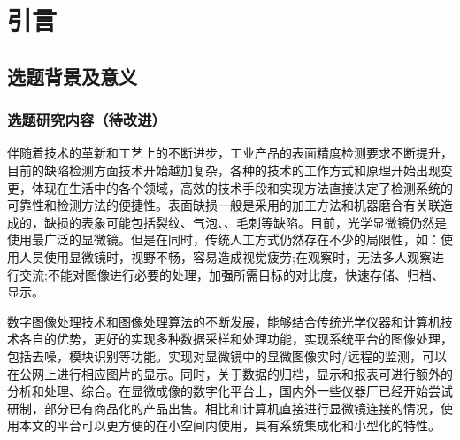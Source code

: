 {\tiny {\tiny }}\chapter{引言}
\section{选题背景及意义}
\subsection{选题研究内容（待改进）}
伴随着技术的革新和工艺上的不断进步，工业产品的表面精度检测要求不断提升，目前的缺陷检测方面技术开始越加复杂，各种的技术的工作方式和原理开始出现变更，体现在生活中的各个领域，高效的技术手段和实现方法直接决定了检测系统的可靠性和检测方法的便捷性。表面缺损一般是采用的加工方法和机器磨合有关联造成的，缺损的表象可能包括裂纹、气泡、、毛刺等缺陷。目前，光学显微镜仍然是使用最广泛的显微镜。但是在同时，传统人工方式仍然存在不少的局限性，如：使用人员使用显微镜时，视野不畅，容易造成视觉疲劳;在观察时，无法多人观察进行交流;不能对图像进行必要的处理，加强所需目标的对比度，快速存储、归档、显示。

数字图像处理技术和图像处理算法的不断发展，能够结合传统光学仪器和计算机技术各自的优势，更好的实现多种数据采样和处理功能，实现系统平台的图像处理，包括去噪，模块识别等功能。实现对显微镜中的显微图像实时/远程的监测，可以在公网上进行相应图片的显示。同时，关于数据的归档，显示和报表可进行额外的分析和处理、综合。在显微成像的数字化平台上，国内外一些仪器厂已经开始尝试研制，部分已有商品化的产品出售。相比和计算机直接进行显微镜连接的情况，使用本文的平台可以更方便的在小空间内使用，具有系统集成化和小型化的特性。


